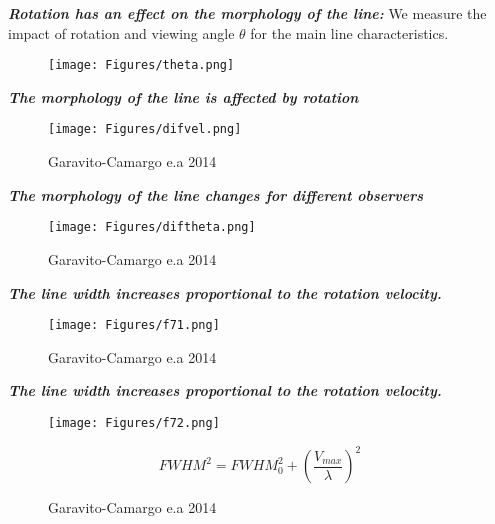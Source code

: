 \documentclass{beamer}
\begin{document}
\begin{frame}{\textit{\textbf{Rotation has an effect on the morphology of the line:}}}
\LARGE{We measure the impact of rotation and viewing angle $\theta$ for the 
main line characteristics.}
\begin{figure}
\texttt{[image: Figures/theta.png]}
\end{figure}
\end{frame}

\begin{frame}{\textit{\textbf{The morphology of the line is affected by rotation}}}
\begin{figure}
\texttt{[image: Figures/difvel.png]}
\caption*{Garavito-Camargo e.a 2014}
\end{figure}
\end{frame}

\begin{frame}{\textit{\textbf{The morphology of the line changes for different observers}}}
\begin{figure}
\texttt{[image: Figures/diftheta.png]}
\caption*{Garavito-Camargo e.a 2014}
\end{figure}
\end{frame}




\begin{frame}{\textit{\textbf{The line width increases proportional to the rotation velocity.}}}
\begin{figure}
\texttt{[image: Figures/f71.png]}
\caption*{Garavito-Camargo e.a 2014}
\end{figure}
\end{frame}



\begin{frame}{\textit{\textbf{The line width increases proportional to the rotation velocity.}}}
\begin{figure}
\texttt{[image: Figures/f72.png]}
\caption*{Garavito-Camargo e.a 2014}
\[
FWHM^2 = FWHM_0 ^2 + \left (\dfrac{V_{max}}{\lambda}\right ) ^2
\]

\end{figure}
\end{frame}
\end{document}
